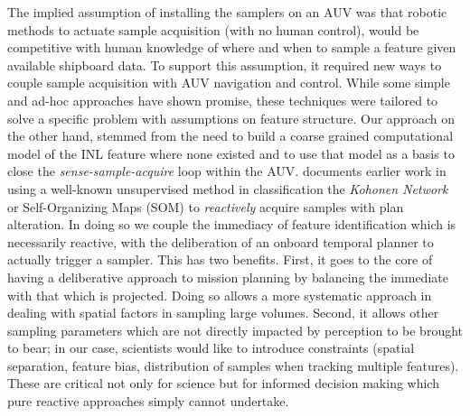 The implied assumption of installing the samplers on an AUV was that
robotic methods to actuate sample acquisition (with no human control),
would be competitive with human knowledge of where and when to sample
a feature given available shipboard data. To support this assumption,
it required new ways to couple sample acquisition with AUV navigation
and control. While some simple and ad-hoc approaches \cite{yanwu10,
  yanwu11} have shown promise, these techniques were tailored to solve
a specific problem with assumptions on feature structure.  Our
approach on the other hand, stemmed from the need to build a coarse
grained computational model of the INL feature where none existed and
to use that model as a basis to close the \emph{sense-sample-acquire}
loop within the AUV. \cite{fox2007} documents earlier work in using a
well-known unsupervised method in classification the \emph{Kohonen
  Network} or Self-Organizing Maps (SOM) \cite{kohonen} to
\emph{reactively} acquire samples with plan alteration. In doing so we
couple the immediacy of feature identification which is necessarily
reactive, with the deliberation of an onboard temporal planner to
actually trigger a sampler. This has two benefits. First, it goes to
the core of having a deliberative approach to mission planning by
balancing the immediate with that which is projected. Doing so allows
a more systematic approach in dealing with spatial factors in sampling
large volumes. Second, it allows other sampling parameters which are
not directly impacted by perception to be brought to bear; in our
case, scientists would like to introduce constraints (spatial
separation, feature bias, distribution of samples when tracking
multiple features). These are critical not only for science but for
informed decision making which pure reactive approaches simply cannot
undertake.

